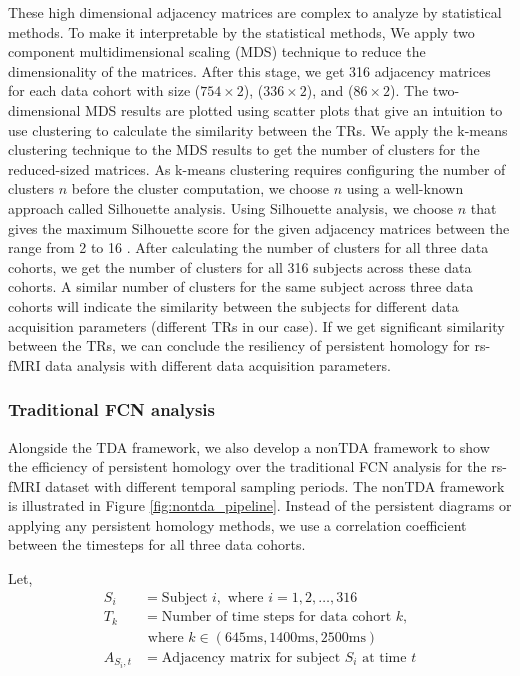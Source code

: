 These high dimensional adjacency matrices are complex to analyze by statistical methods. To make it interpretable by the statistical methods, We apply two component multidimensional scaling (MDS) technique to reduce the dimensionality of the matrices. After this stage, we get 316 adjacency matrices for each data cohort with size ($ 754 \times 2 $), ($ 336 \times 2 $), and ($ 86 \times 2 $). The two-dimensional MDS results are plotted using scatter plots that give an intuition to use clustering to calculate the similarity between the TRs. We apply the k-means clustering technique to the MDS results to get the number of clusters for the reduced-sized matrices. As k-means clustering requires configuring the number of clusters $n$ before the cluster computation, we choose $n$ using a well-known approach called Silhouette analysis. Using Silhouette analysis, we choose $n$ that gives the maximum Silhouette score for the given adjacency matrices between the range from 2 to 16 \cite{scikit-learn, rousseeuw1987silhouettes}. After calculating the number of clusters for all three data cohorts, we get the number of clusters for all 316 subjects across these data cohorts. A similar number of clusters for the same subject across three data cohorts will indicate the similarity between the subjects for different data acquisition parameters (different TRs in our case). If we get significant similarity between the TRs, we can conclude the resiliency of persistent homology for rs-fMRI data analysis with different data acquisition parameters.



\subsubsection{Traditional FCN analysis}
\label{sec:nontda_pipeline}
Alongside the TDA framework, we also develop a nonTDA framework to show the efficiency of persistent homology over the traditional FCN analysis for the rs-fMRI dataset with different temporal sampling periods. The nonTDA framework is illustrated in Figure \ref{fig:nontda_pipeline}. Instead of the persistent diagrams or applying any persistent homology methods, we use a correlation coefficient between the timesteps for all three data cohorts. 


Let,
\begin{align*}
S_i &= \text{Subject } i, \text{ where } i = 1,2,\ldots,316 \\
T_k &= \text{Number of time steps for data cohort } k, \\
&\text{ where } k\in(645\text{ms}, 1400\text{ms}, 2500\text{ms}) \\
A_{S_i,t} &= \text{Adjacency matrix for subject } S_i \text{ at time } t
\end{align*}

